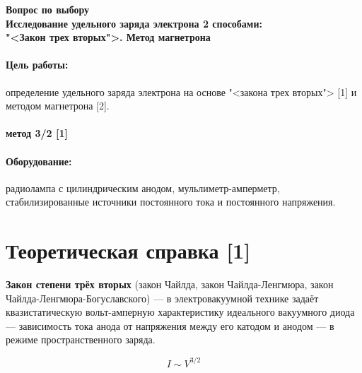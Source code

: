 \documentclass[a4paper,12pt]{article}
\theoremstyle{definition}
\begin{document}
\begin{titlepage}
	\begin{center}

		\LARGE \textbf{Вопрос по выбору}\\ \vspace{0.2cm}
		\LARGE \textbf{Исследование удельного заряда электрона 2 способами:\\ 
        "<Закон трех вторых">. Метод магнетрона}
	\end{center}
	\vspace{2.3cm} \large
	
	\begin{center}
		\vspace{10mm}
		
	
		
		
	\end{center}
	
\end{titlepage}



\paragraph*{Цель работы:} определение удельного заряда электрона на основе "<закона трех вторых"> [1] и методом магнетрона [2].

\paragraph*{\LARGE  метод 3/2 [1]}
\paragraph*{Оборудование:} радиолампа с цилиндрическим анодом, мульлиметр-амперметр, стабилизированные источники постоянного тока и постоянного напряжения.


\section{Теоретическая справка [1]}

\textbf{Закон степени трёх вторых} (закон Чайлда, закон Чайлда-Ленгмюра, закон Чайлда-Ленгмюра-Богуславского) ---  в электровакуумной технике задаёт квазистатическую вольт-амперную характеристику идеального вакуумного диода --- зависимость тока анода от напряжения между его катодом и анодом --- в режиме пространственного заряда.

\begin{equation}\label{}
I \sim V^{3/2}
\end{equation}
\end{document}
